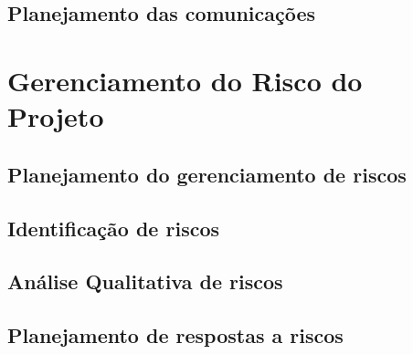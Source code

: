     \section{Planejamento das comunicações}



\chapter{Gerenciamento do Risco do Projeto}



    \section{Planejamento do gerenciamento de riscos}



    \section{Identificação de riscos}



    \section{Análise Qualitativa de riscos}



    \section{Planejamento de respostas a riscos}



